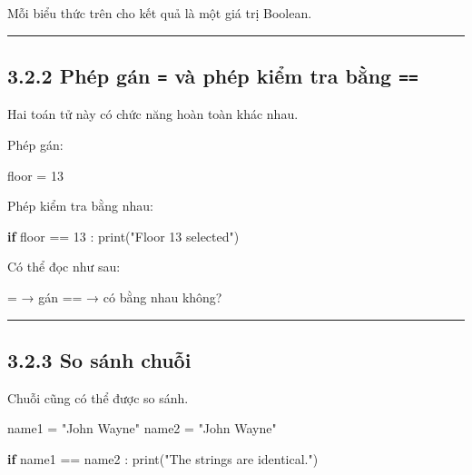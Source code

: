 \documentclass[
  11pt,
  a4paper,
]{article}
\newenvironment{Shaded}{}{}
\newcommand{\BuiltInTok}[1]{\textcolor[rgb]{0.00,0.50,0.00}{#1}}
\newcommand{\ControlFlowTok}[1]{\textcolor[rgb]{0.00,0.44,0.13}{\textbf{#1}}}
\newcommand{\DecValTok}[1]{\textcolor[rgb]{0.25,0.63,0.44}{#1}}
\newcommand{\NormalTok}[1]{#1}
\newcommand{\OperatorTok}[1]{\textcolor[rgb]{0.40,0.40,0.40}{#1}}
\newcommand{\StringTok}[1]{\textcolor[rgb]{0.25,0.44,0.63}{#1}}
\begin{document}
Mỗi biểu thức trên cho kết quả là một giá trị Boolean.

\begin{center}\rule{0.5\linewidth}{0.5pt}\end{center}

\subsection{\texorpdfstring{3.2.2 Phép gán \texttt{=} và phép kiểm tra
bằng
\texttt{==}}{3.2.2 Phép gán = và phép kiểm tra bằng ==}}\label{phuxe9p-guxe1n-vuxe0-phuxe9p-kiux1ec3m-tra-bux1eb1ng}

Hai toán tử này có chức năng hoàn toàn khác nhau.

Phép gán:

\begin{Shaded}
\begin{Highlighting}[]
\NormalTok{floor }\OperatorTok{=} \DecValTok{13}
\end{Highlighting}
\end{Shaded}

Phép kiểm tra bằng nhau:

\begin{Shaded}
\begin{Highlighting}[]
\ControlFlowTok{if}\NormalTok{ floor }\OperatorTok{==} \DecValTok{13}\NormalTok{ :}
    \BuiltInTok{print}\NormalTok{(}\StringTok{"Floor 13 selected"}\NormalTok{)}
\end{Highlighting}
\end{Shaded}

Có thể đọc như sau:

\begin{Shaded}
\begin{Highlighting}[]
\NormalTok{=   → gán}
\NormalTok{==  → có bằng nhau không?}
\end{Highlighting}
\end{Shaded}

\begin{center}\rule{0.5\linewidth}{0.5pt}\end{center}

\subsection{3.2.3 So sánh chuỗi}\label{so-suxe1nh-chuux1ed7i}

Chuỗi cũng có thể được so sánh.

\begin{Shaded}
\begin{Highlighting}[]
\NormalTok{name1 }\OperatorTok{=} \StringTok{"John Wayne"}
\NormalTok{name2 }\OperatorTok{=} \StringTok{"John Wayne"}

\ControlFlowTok{if}\NormalTok{ name1 }\OperatorTok{==}\NormalTok{ name2 :}
    \BuiltInTok{print}\NormalTok{(}\StringTok{"The strings are identical."}\NormalTok{)}
\end{Highlighting}
\end{Shaded}
\end{document}
